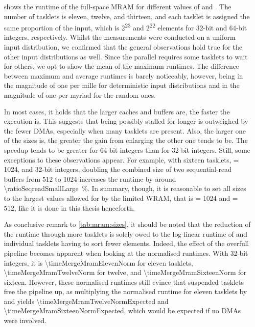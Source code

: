  shows the runtime of the full-space MRAM \MS{} for different values of \cachesize{} and \seqreadcachesize{}.
The number of tasklets is eleven, twelve, and thirteen, and each tasklet is assigned the same proportion of the input, which is 2\textsuperscript{23} and 2\textsuperscript{22} elements for 32-bit and 64-bit integers, respectively.
Whilst the measurements were conducted on a uniform input distribution, we confirmed that the general observations hold true for the other input distributions as well.
Since the parallel \MS{} requires some tasklets to wait for others, we opt to show the mean of the maximum runtimes.
The difference between maximum and average runtimes is barely noticeably, however, being in the magnitude of one per mille for deterministic input distributions and in the magnitude of one per myriad for the random ones.

In most cases, it holds that the larger caches and buffers are, the faster the execution is.
This suggests that being possibly stalled for longer is outweighed by the fewer DMAs, especially when many tasklets are present.
Also, the larger one of the sizes is, the greater the gain from enlarging the other one tends to be.
The speedup tends to be greater for 64-bit integers than for 32-bit integers.
Still, some exceptions to these observations appear.
For example, with sixteen tasklets, \cachesize{} = 1024, and 32-bit integers, doubling the combined size of two sequential-read buffers from \qty{512}{\byte} to \qty{1024}{\byte} increases the runtime by around \qty[round-mode=places, round-precision=0]{\ratioSeqreadSmallLarge}{\percent}.
In summary, though, it is reasonable to set all sizes to the largest values allowed for by the limited WRAM, that is \cachesize{} = 1024 and \seqreadcachesize{} = 512, like it is done in this thesis henceforth.

As conclusive remark to \cref{tab:mram:sizes}, it should be noted that the reduction of the runtime through more tasklets is solely owed to the log-linear runtime of \MS{} and individual tasklets having to sort fewer elements.
Indeed, the effect of the overfull pipeline becomes apparent when looking at the normalised runtimes.
With 32-bit integers, it is \qty[round-mode=places, round-precision=1]{\timeMergeMramElevenNorm}{\cycle} for eleven tasklets, \qty[round-mode=places, round-precision=1]{\timeMergeMramTwelveNorm}{\cycle} for twelve, and \qty[round-mode=places, round-precision=1]{\timeMergeMramSixteenNorm}{\cycle} for sixteen.
However, these normalised runtimes still evince that suspended tasklets free the pipeline up, as multiplying the normalised runtime for eleven tasklets by  and  yields \qty[round-mode=places, round-precision=1]{\timeMergeMramTwelveNormExpected}{\cycle} and \qty[round-mode=places, round-precision=1]{\timeMergeMramSixteenNormExpected}{\cycle}, which would be expected if no DMAs were involved.


